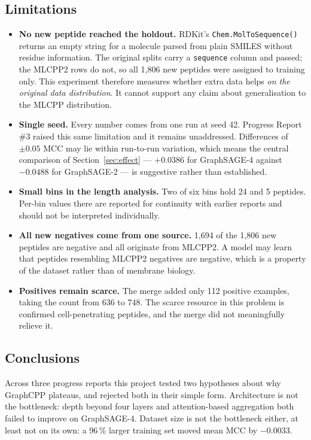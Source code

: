 \documentclass[11pt,a4paper]{article}
\newcommand{\code}[1]{\texttt{\small #1}}
\begin{document}
\subsection{Limitations}
\begin{itemize}
  \item \textbf{No new peptide reached the holdout.} RDKit's \code{Chem.MolToSequence()} returns an empty
  string for a molecule parsed from plain SMILES without residue information. The original splits carry a
  \code{sequence} column and passed; the MLCPP2 rows do not, so all 1{,}806 new peptides were assigned to
  training only. This experiment therefore measures whether extra data helps \emph{on the original data
  distribution}. It cannot support any claim about generalisation to the MLCPP distribution.
  \item \textbf{Single seed.} Every number comes from one run at seed 42. Progress Report \#3 raised this
  same limitation and it remains unaddressed. Differences of $\pm 0.05$ MCC may lie within run-to-run
  variation, which means the central comparison of Section~\ref{sec:effect} --- $+0.0386$ for GraphSAGE-4
  against $-0.0488$ for GraphSAGE-2 --- is suggestive rather than established.
  \item \textbf{Small bins in the length analysis.} Two of six bins hold 24 and 5 peptides. Per-bin values
  there are reported for continuity with earlier reports and should not be interpreted individually.
  \item \textbf{All new negatives come from one source.} 1{,}694 of the 1{,}806 new peptides are negative
  and all originate from MLCPP2. A model may learn that peptides resembling MLCPP2 negatives are negative,
  which is a property of the dataset rather than of membrane biology.
  \item \textbf{Positives remain scarce.} The merge added only 112 positive examples, taking the count
  from 636 to 748. The scarce resource in this problem is confirmed cell-penetrating peptides, and the
  merge did not meaningfully relieve it.
\end{itemize}

\subsection{Conclusions}
Across three progress reports this project tested two hypotheses about why GraphCPP plateaus, and rejected
both in their simple form. Architecture is not the bottleneck: depth beyond four layers and
attention-based aggregation both failed to improve on GraphSAGE-4. Dataset size is not the bottleneck
either, at least not on its own: a 96\,\% larger training set moved mean MCC by $-0.0033$.
\end{document}
